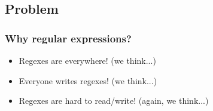 
\subsection{Problem}
\begin{frame}
\frametitle{Why regular expressions?}

\begin{itemize}
\item<2-> Regexes are everywhere! (we think...)
\item<3-> Everyone writes regexes! (we think...)
\item<4-> Regexes are hard to read/write! (again, we think...)
\end{itemize}
%
%
%
%

\end{frame}



